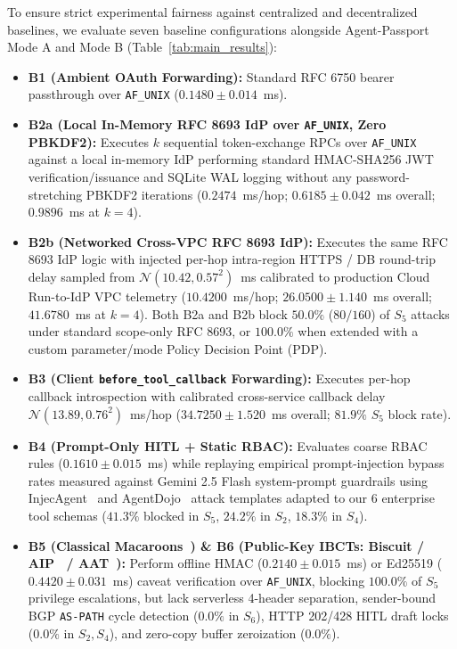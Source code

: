 \documentclass[conference,10pt]{IEEEtran}
\begin{document}
To ensure strict experimental fairness against centralized and decentralized baselines, we evaluate seven baseline configurations alongside Agent-Passport Mode A and Mode B (Table~\ref{tab:main_results}):
\begin{itemize}
    \item \textbf{B1 (Ambient OAuth Forwarding):} Standard RFC 6750 bearer passthrough over \texttt{AF\_UNIX} ($0.1480 \pm 0.014$~ms).
    \item \textbf{B2a (Local In-Memory RFC 8693 IdP over \texttt{AF\_UNIX}, Zero PBKDF2):} Executes $k$ sequential token-exchange RPCs over \texttt{AF\_UNIX} against a local in-memory IdP performing standard HMAC-SHA256 JWT verification/issuance and SQLite WAL logging without any password-stretching PBKDF2 iterations ($0.2474$~ms/hop; $0.6185 \pm 0.042$~ms overall; $0.9896$~ms at $k=4$).
    \item \textbf{B2b (Networked Cross-VPC RFC 8693 IdP):} Executes the same RFC 8693 IdP logic with injected per-hop intra-region HTTPS / DB round-trip delay sampled from $\mathcal{N}(10.42, 0.57^2)$~ms calibrated to production Cloud Run-to-IdP VPC telemetry ($10.4200$~ms/hop; $26.0500 \pm 1.140$~ms overall; $41.6780$~ms at $k=4$). Both B2a and B2b block $50.0\%$ ($80/160$) of $S_5$ attacks under standard scope-only RFC 8693, or $100.0\%$ when extended with a custom parameter/mode Policy Decision Point (PDP).
    \item \textbf{B3 (Client \texttt{before\_tool\_callback} Forwarding):} Executes per-hop callback introspection with calibrated cross-service callback delay $\mathcal{N}(13.89, 0.76^2)$~ms/hop ($34.7250 \pm 1.520$~ms overall; $81.9\%$ $S_5$ block rate).
    \item \textbf{B4 (Prompt-Only HITL + Static RBAC):} Evaluates coarse RBAC rules ($0.1610 \pm 0.015$~ms) while replaying empirical prompt-injection bypass rates measured against Gemini 2.5 Flash system-prompt guardrails using InjecAgent~\cite{zhan2024injecagent} and AgentDojo~\cite{debenedetti2024agentdojo} attack templates adapted to our 6 enterprise tool schemas ($41.3\%$ blocked in $S_5$, $24.2\%$ in $S_2$, $18.3\%$ in $S_4$).
    \item \textbf{B5 (Classical Macaroons~\cite{birgisson2014macaroons}) \& B6 (Public-Key IBCTs: Biscuit / AIP~\cite{prakash2026aip} / AAT~\cite{niyikiza2026aat}):} Perform offline HMAC ($0.2140 \pm 0.015$~ms) or Ed25519 ($0.4420 \pm 0.031$~ms) caveat verification over \texttt{AF\_UNIX}, blocking $100.0\%$ of $S_5$ privilege escalations, but lack serverless 4-header separation, sender-bound BGP \texttt{AS-PATH} cycle detection ($0.0\%$ in $S_6$), HTTP 202/428 HITL draft locks ($0.0\%$ in $S_2, S_4$), and zero-copy buffer zeroization ($0.0\%$).
\end{itemize}
\end{document}
